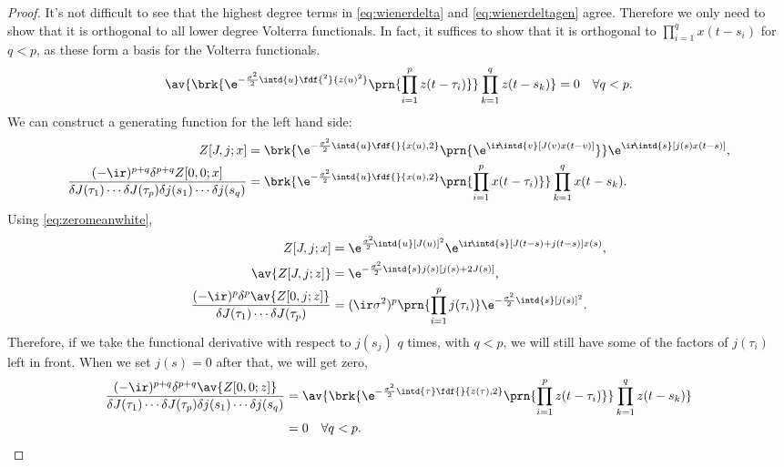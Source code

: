 \documentclass[12pt]{article}
\begin{document}
%
\begin{proof}
  It's not difficult to see that the highest degree terms in \eqref{eq:wienerdelta} and \eqref{eq:wienerdeltagen} agree.
  Therefore we only need to show that it is orthogonal to all lower degree Volterra functionals.
  In fact, it suffices to show that it is orthogonal to $\prod_{i=1}^q x(t-s_i)$ for $q<p$, as these form a basis for the Volterra functionals.
  \begin{equation}\label{eq:wienerdeltavol}
    \av{\brk{\e^{-\frac{\sigma^2}{2}\intd{u}\fdf{^2}{z(u)^2}}
             \prn{\prod_{i=1}^p z(t-\tau_i)}}
        \prod_{k=1}^q z(t-s_k)} = 0 \quad \forall q<p.
  \end{equation}
  We can construct a generating function for the left hand side:
  \begin{equation}\label{eq:wienerdeltavolgen}
    \begin{aligned}
      Z[J,j;x] &= \brk{\e^{-\frac{\sigma^2}{2}\intd{u}\fdf{}{x(u),2}}
                     \prn{\e^{\ir\!\intd{v} [J(v) x(t-v)]}}}
                \e^{\ir\!\intd{s} [j(s) x(t-s)]},\\
      \frac{(-\ir)^{p+q}\delta^{p+q}Z[0,0;x]}
           {\delta J(\tau_1) \cdots \delta J(\tau_p) \delta j(s_1) \cdots \delta j(s_q)}
           &= \brk{\e^{-\frac{\sigma^2}{2}\intd{u}\fdf{}{x(u),2}}
                  \prn{\prod_{i=1}^p x(t-\tau_i)}}
              \prod_{k=1}^q x(t-s_k).
    \end{aligned}
  \end{equation}
  Using \eqref{eq:zeromeanwhite},
  \begin{equation*}
  \begin{aligned}
    Z[J,j;x] &= \e^{\frac{\sigma^2}{2}\!\intd{u} [J(u)]^2}
                \e^{\ir\!\intd{s} [J(t-s)+j(t-s)] x(s)}, \\
    \av{Z[J,j;z]} &= \e^{-\frac{\sigma^2}{2}\intd{s} j(s)[j(s)+2J(s)]},\\
    \frac{(-\ir)^{p}\delta^{p}\av{Z[0,j;z]}}
         {\delta J(\tau_1) \cdots \delta J(\tau_p)}
      &= (\ir\sigma^2)^p \prn{\prod_{i=1}^p j(\tau_i)}
          \e^{-\frac{\sigma^2}{2}\intd{s} [j(s)]^2}.
  \end{aligned}
  \end{equation*}
  Therefore, if we take the functional derivative with respect to $j(s_j)$ $q$ times, with $q<p$, we will still have some of the factors of $j(\tau_i)$ left in front.
  When we set $j(s)=0$ after that, we will get zero, \ie
  \begin{equation*}
  \begin{aligned}
    \frac{(-\ir)^{p+q}\delta^{p+q}\av{Z[0,0;z]}}
         {\delta J(\tau_1) \cdots \delta J(\tau_p) \delta j(s_1) \cdots \delta j(s_q)}
         &= \av{\brk{\e^{-\frac{\sigma^2}{2}\intd{\tau}\fdf{}{z(\tau),2}}
                      \prn{\prod_{i=1}^p z(t-\tau_i)}}
            \prod_{k=1}^q z(t-s_k)}\\ &= 0 \quad \forall q<p.
  \end{aligned}
  \end{equation*}
\end{proof}
\end{document}
